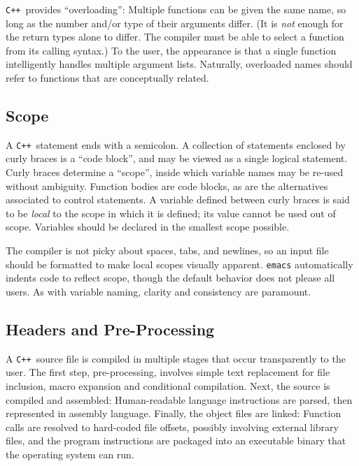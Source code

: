 \documentclass[12pt,letterpaper]{book}
\newcommand{\code}[1]{\texttt{#1}}
\newcommand{\CXX}{\code{C++}}
\begin{document}
\CXX\ provides ``overloading'': Multiple functions can be given the
same name, so long as the number and/or type of their arguments
differ. (It is \emph{not} enough for the return types alone to differ.
The compiler must be able to select a function from its calling
syntax.)  To the user, the appearance is that a single function
intelligently handles multiple argument lists. Naturally, overloaded
names should refer to functions that are conceptually related.


\subsection{Scope}

A \CXX\ statement ends with a semicolon. A collection of statements
enclosed by curly braces is a ``code block'', and may be viewed as a
single logical statement. Curly braces determine a ``scope'', inside
which variable names may be re-used without ambiguity.  Function
bodies are code blocks, as are the alternatives associated to control
statements.  A variable defined between curly braces is said to be
\emph{local} to the scope in which it is defined; its value cannot
be used out of scope.  Variables should be declared in the smallest
scope possible.

The compiler is not picky about spaces, tabs, and newlines, so an
input file should be formatted to make local scopes visually
apparent. \code{emacs} automatically indents code to reflect scope,
though the default behavior does not please all users.  As with
variable naming, clarity and consistency are paramount.


\subsection{Headers and Pre-Processing}

A \CXX\ source file is compiled in multiple stages that occur
transparently to the user. The first step, pre-processing, involves
simple text replacement for file inclusion, macro expansion and
conditional compilation. Next, the source is compiled and assembled:
Human-readable language instructions are parsed, then represented in
assembly language. Finally, the object files are linked: Function
calls are resolved to hard-coded file offsets, possibly involving
external library files, and the program instructions are packaged into
an executable binary that the operating system can run.
\end{document}
